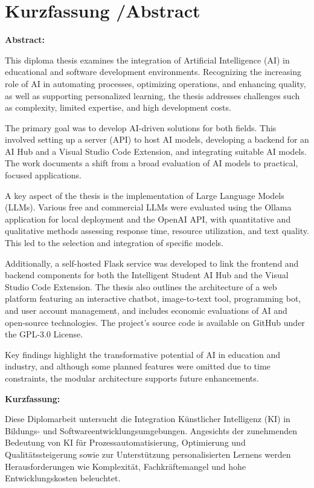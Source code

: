 

\small{\chapter*{Kurzfassung /Abstract }}
\label{cha:abstract}

\small{
\textbf{Abstract:}

This diploma thesis examines the integration of Artificial Intelligence (AI) in educational and software development environments. Recognizing the increasing role of AI in automating processes, optimizing operations, and enhancing quality, as well as supporting personalized learning, the thesis addresses challenges such as complexity, limited expertise, and high development costs.
    
The primary goal was to develop AI-driven solutions for both fields. This involved setting up a server (API) to host AI models, developing a backend for an AI Hub and a Visual Studio Code Extension, and integrating suitable AI models. The work documents a shift from a broad evaluation of AI models to practical, focused applications.
    
A key aspect of the thesis is the implementation of Large Language Models (LLMs). Various free and commercial LLMs were evaluated using the Ollama application for local deployment and the OpenAI API, with quantitative and qualitative methods assessing response time, resource utilization, and text quality. This led to the selection and integration of specific models.
    
Additionally, a self-hosted Flask service was developed to link the frontend and backend components for both the Intelligent Student AI Hub and the Visual Studio Code Extension. The thesis also outlines the architecture of a web platform featuring an interactive chatbot, image-to-text tool, programming bot, and user account management, and includes economic evaluations of AI and open-source technologies. The project’s source code is available on GitHub under the GPL-3.0 License.
    
Key findings highlight the transformative potential of AI in education and industry, and although some planned features were omitted due to time constraints, the modular architecture supports future enhancements.

\newpage

\textbf{Kurzfassung:}
    
Diese Diplomarbeit untersucht die Integration Künstlicher Intelligenz (KI) in Bildungs- und Softwareentwicklungsumgebungen. Angesichts der zunehmenden Bedeutung von KI für Prozessautomatisierung, Optimierung und Qualitätssteigerung sowie zur Unterstützung personalisierten Lernens werden Herausforderungen wie Komplexität, Fachkräftemangel und hohe Entwicklungskosten beleuchtet.
    
}
